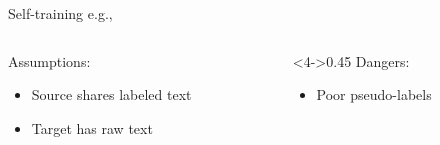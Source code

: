 \documentclass[14pt]{beamer}
\begin{document}
\begin{frame}{Self-training \hfill\small e.g., \cite{yarowsky-1995-unsupervised,ruder-plank-2018-strong}}

\vspace*{-0.25\baselineskip}
\begin{columns}[T]
\begin{column}{0.53\textwidth}
Assumptions:
\begin{itemize}
\item Source shares labeled text
\item Target has raw text
\end{itemize}
\end{column}
\begin{column}<4->{0.45\textwidth}
Dangers:
\begin{itemize}
\item Poor pseudo-labels
\end{itemize}
\end{column}
\end{columns}
\end{frame}
\end{document}
